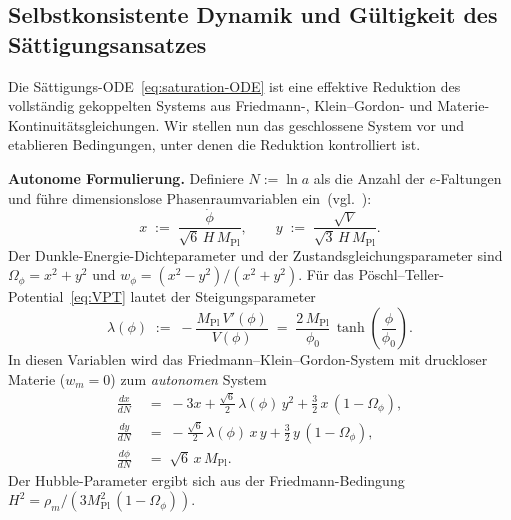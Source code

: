 \documentclass[12pt,a4paper]{article}
\theoremstyle{definition}
\theoremstyle{plain}
\theoremstyle{remark}
\begin{document}
\subsection{Selbstkonsistente Dynamik und G\"ultigkeit des S\"attigungsansatzes}
\label{sec:self-consistent}

Die S\"attigungs-ODE~\eqref{eq:saturation-ODE} ist eine effektive
Reduktion des vollst\"andig gekoppelten Systems aus Friedmann-,
Klein--Gordon- und Materie-Kontinuit\"atsgleichungen. Wir stellen nun
das geschlossene System vor und etablieren Bedingungen, unter denen
die Reduktion kontrolliert ist.

\medskip
\noindent\textbf{Autonome Formulierung.}\;
Definiere $N := \ln a$ als die Anzahl der $e$-Faltungen und f\"uhre
dimensionslose Phasenraumvariablen ein~(vgl.~\cite{CopelandLiddleWands1998}):
\begin{equation}\label{eq:xy-def}
  x \;:=\; \frac{\dot\phi}{\sqrt{6}\,H\,M_{\mathrm{Pl}}},
  \qquad
  y \;:=\; \frac{\sqrt{V}}{\sqrt{3}\,H\,M_{\mathrm{Pl}}}.
\end{equation}
Der Dunkle-Energie-Dichteparameter und der Zustandsgleichungsparameter
sind $\Omega_\phi = x^2 + y^2$ und $w_\phi = (x^2 - y^2)/(x^2 + y^2)$.
F\"ur das P\"oschl--Teller-Potential~\eqref{eq:VPT} lautet der
Steigungsparameter
\begin{equation}\label{eq:lambda-PT}
  \lambda(\phi) \;:=\;
  -\frac{M_{\mathrm{Pl}}\,V'(\phi)}{V(\phi)}
  \;=\; \frac{2\,M_{\mathrm{Pl}}}{\phi_0}\,
  \tanh\!\left(\frac{\phi}{\phi_0}\right).
\end{equation}
In diesen Variablen wird das Friedmann--Klein--Gordon-System mit
druckloser Materie ($w_m = 0$) zum \emph{autonomen} System
\begin{align}
  \frac{dx}{dN} &\;=\;
    -3x + \frac{\sqrt{6}}{2}\,\lambda(\phi)\,y^2
    + \frac{3}{2}\,x\,(1 - \Omega_\phi),
    \label{eq:dx}\\[4pt]
  \frac{dy}{dN} &\;=\;
    -\frac{\sqrt{6}}{2}\,\lambda(\phi)\,x\,y
    + \frac{3}{2}\,y\,(1 - \Omega_\phi),
    \label{eq:dy}\\[4pt]
  \frac{d\phi}{dN} &\;=\; \sqrt{6}\,x\,M_{\mathrm{Pl}}.
    \label{eq:dphi}
\end{align}
Der Hubble-Parameter ergibt sich aus der Friedmann-Bedingung
$H^2 = \rho_m/(3M_{\mathrm{Pl}}^2\,(1 - \Omega_\phi))$.
\end{document}
